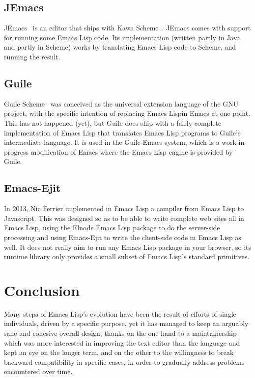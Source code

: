 \documentclass[format=acmsmall, review]{acmart}
\newcommand \Elisp {Emacs Lisp}
\begin{document}
\subsection{JEmacs}

JEmacs~\cite{Bothner2001} is an editor that ships with Kawa
Scheme~\cite{KawaScheme}.  JEmacs comes with support for running some
\Elisp{} code.  Its implementation (written partly in Java and
partly in Scheme) works by translating \Elisp{} code to Scheme, and
running the result.

\subsection{Guile}

Guile Scheme~\cite{Guile2018} was conceived as the universal extension
language of the GNU project, with the specific intention of replacing
\Elisp in Emacs at one point.  This has not happened (yet), but Guile does
ship with a fairly complete implementation of \Elisp{} that translates
\Elisp{} programs to Guile's intermediate language.  It is used in the
Guile-Emacs system, which is a work-in-progress modification of Emacs where
the \Elisp{} engine is provided by Guile.

\subsection{Emacs-Ejit}

In 2013, Nic Ferrier implemented in \Elisp{} a compiler from \Elisp{} to
Javascript.  This was designed so as to be able to write complete web sites
all in \Elisp{}, using the Elnode \Elisp{} package to do the server-side
processing and using Emacs-Ejit to write the client-side code in \Elisp{}
as well.  It does not really aim to run any \Elisp{} package in your
browser, so its runtime library only provides a small subset of \Elisp's
standard primitives.

\section{Conclusion}
\label{sec:conclusion}

Many steps of \Elisp's evolution have been the result of efforts of single
individuals, driven by a specific purpose, yet it has managed to keep an
arguably sane and cohesive overall design, thanks on the one hand to
a maintainership which was more interested in improving the text editor than
the language and kept an eye on the longer term, and on the other to the
willingness to break backward compatibility in specific cases, in order to
gradually address problems encountered over time.
\end{document}
